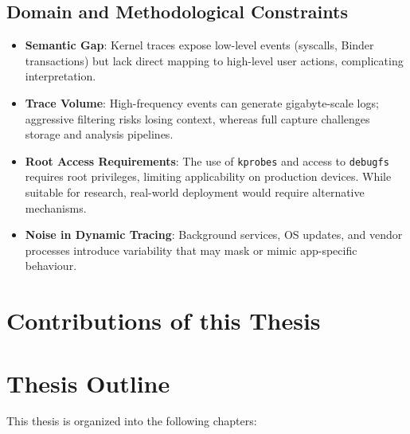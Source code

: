 \documentclass[a4paper,12pt]{report}
\begin{document}
\subsection*{Domain and Methodological Constraints}
\begin{itemize}
    \item \textbf{Semantic Gap}: Kernel traces expose low-level events (syscalls, Binder transactions) but lack direct mapping to high-level user actions, complicating interpretation.
    \item \textbf{Trace Volume}: High-frequency events can generate gigabyte-scale logs; aggressive filtering risks losing context, whereas full capture challenges storage and analysis pipelines.
    \item \textbf{Root Access Requirements}: The use of \texttt{kprobes} and access to \texttt{debugfs} requires root privileges, limiting applicability on production devices. While suitable for research, real-world deployment would require alternative mechanisms.
    \item \textbf{Noise in Dynamic Tracing}: Background services, OS updates, and vendor processes introduce variability that may mask or mimic app-specific behaviour.
\end{itemize}

\section{Contributions of this Thesis}

\section{Thesis Outline}
This thesis is organized into the following chapters:
\end{document}
